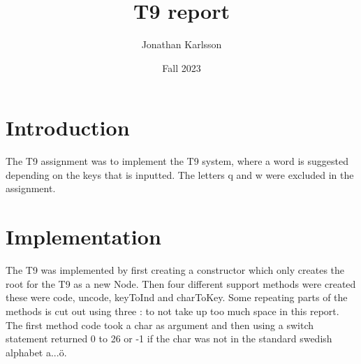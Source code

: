 \documentclass[a4paper,11pt]{article}
\begin{document}
\title{
    \textbf{T9 report}
}
\author{Jonathan Karlsson}
\date{Fall 2023}

\maketitle

\section*{Introduction}
The T9 assignment was to implement the T9 system, where a word is suggested depending on the keys that is inputted. The letters q and w were excluded in the assignment.
\section*{Implementation}
The T9 was implemented by first creating a constructor which only creates the root for the T9 as a new Node. Then four different 
support methods were created these were code, uncode, keyToInd and charToKey. Some repeating parts of the methods is cut out using three : to not take up too much space in this report.
The first method code took a char as argument and then using a switch statement returned 0 to 26 or -1 if the char was not in the standard swedish alphabet a...ö. 
\end{document}

